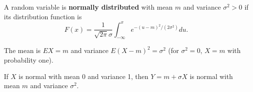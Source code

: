 A random variable is \textbf{normally distributed} with mean $m$ and variance $\sigma^2 > 0$ if its distribution function is
$$F(x) = \frac{1}{\sqrt{2\pi}\sigma} \int_{-\infty}^{x} e^{-(u-m)^2/(2\sigma^2)} du.$$

The mean is $EX = m$ and variance $E(X-m)^2 = \sigma^2$ (for $\sigma^2 = 0$, $X = m$ with probability one).

If $X$ is normal with mean 0 and variance 1, then $Y = m + \sigma X$ is normal with mean $m$ and variance $\sigma^2$.
